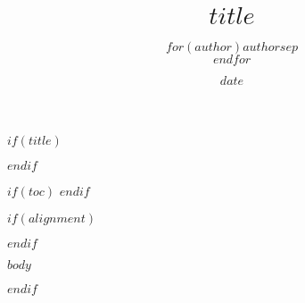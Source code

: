 \documentclass[uplatex]{jsarticle}
\title{$title$}
\author{$for(author)$$author$$sep$\\$endfor$}
\date{$date$}
\begin{document}
$if(title)$
\maketitle
$endif$

$if(toc)$
\tableofcontents
$endif$

$if(alignment)$
\begin{$alignment$}
$endif$

$body$

\end{$alignment$}
$endif$
\end{document}
